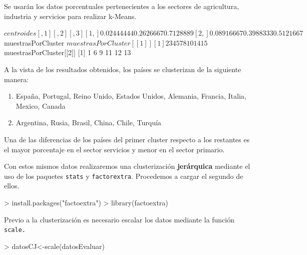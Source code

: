 \documentclass [a4paper] {article}
\begin{document}
\bigskip
Se usarán los datos porcentuales pertenecientes a los sectores de agricultura, industria y servicios para realizar
k-Means.

\bigskip
\begin{Schunk}
\begin{Soutput}
$centroides
           [,1]      [,2]      [,3]
[1,] 0.02444444 0.2626667 0.7128889
[2,] 0.08916667 0.3988333 0.5121667

$muestrasPorCluster
$muestrasPorCluster[[1]]
[1]  2  3  4  5  7  8 10 14 15

$muestrasPorCluster[[2]]
[1]  1  6  9 11 12 13
\end{Soutput}
\end{Schunk}

\bigskip
A la vista de los resultados obtenidos, los países se clusterizan de la siguiente manera:
\begin{enumerate}
\item España, Portugal, Reino Unido, Estados Unidos, Alemania, Francia, Italia, Mexico, Canada
\item Argentina, Rusia, Brasil, China, Chile, Turquía
\end{enumerate}

Una de las diferencias de los países del primer cluster respecto a los restantes es el mayor 
porcentaje en el sector servicios y menor en el sector primario.

\bigskip
Con estos mismos datos realizaremos una clusterización \textbf{jerárquica} mediante el uso de los
paquetes \texttt{stats} y \texttt{factorextra}. Procedemos a cargar el segundo de ellos.
\begin{Schunk}
\begin{Sinput}
> install.packages("factoextra")
> library(factoextra)
\end{Sinput}
\end{Schunk}

\bigskip
Previo a la clusterización es necesario escalar los datos mediante la función \texttt{scale.}
\begin{Schunk}
\begin{Sinput}
> datosCJ<-scale(datosEvaluar)
\end{Sinput}
\end{Schunk}
\end{document}
